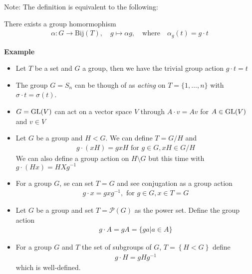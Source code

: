 Note: The definition is equivalent to the following:

There exists a group homormophism
\begin{align*}
	\alpha: G \to \text{Bij}(T), \quad g \mapsto \alpha g, \quad \text{where} \quad \alpha_g(t) = g \cdot t
\end{align*}

\textbf{Example}
\begin{itemize}
	\item Let $T$ be a set and $G$ a group, then we have the trivial group action $g \cdot t = t$ 
	\item The group $G = S_n$ can be though of as \emph{acting} on $T = \{ 1, \ldots, n\}$ with $\sigma \cdot t = \sigma(t)$.
	\item $G = \operatorname{GL}(V)$ can act on a vector space $V$ through $A \cdot v = Av$ for $A \in \operatorname{GL}(V)$ and $v \in V$
	\item Let $G$ be a group and $H < G$. We can define $T = G/H$ and
		\begin{align*}
			g \cdot (xH) = gxH \text{ for } g \in G, xH \in G/H
		\end{align*}
		We can also define a group action on $H \setminus G$ but this time with $g \cdot (Hx) = HXg^{-1}$
	\item For a group $G$, se can set $T = G$ and see conjugation as a group action
		\begin{align*}
			g \cdot x = gxg^{-1}, \text{ for } g \in G, x \in T = G
		\end{align*}
	\item Let $G$ be a group and set $T = \mathcal{P}(G)$ as the power set. Define the group action
		\begin{align*}
			g \cdot A = gA = \{ga \big\vert a \in A\}
		\end{align*}
	\item For a group $G$ and $T$ the set of subgroups of $G$, $T = \left\{H < G\right\}$ define
		\begin{align*}
			g \cdot H = gH g^{-1}
		\end{align*}
		which is well-defined.
\end{itemize}


